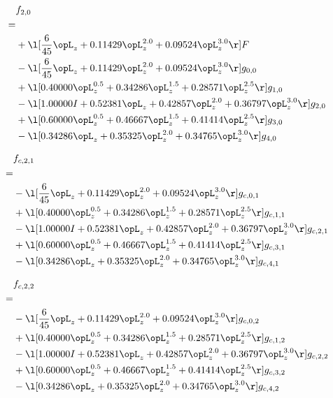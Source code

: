\begin{alignat}{2} 
\label{eq:f_20_0} 
& f_{2,0} \nonumber \\ 
 = \\ 
& + \l[ \frac{6}{45} \opL_z +  0.11429 \opL_z^{2.0} +  0.09524 \opL_z^{3.0}  \r] F \nonumber \\ 
& - \l[ \frac{6}{45} \opL_z +  0.11429 \opL_z^{2.0} +  0.09524 \opL_z^{3.0}  \r] g_{0,0} \nonumber \\ 
& + \l[  0.40000 \opL_z^{0.5} +  0.34286 \opL_z^{1.5} +  0.28571 \opL_z^{2.5}  \r] g_{1,0} \nonumber \\ 
& - \l[  1.00000 I +  0.52381 \opL_z +  0.42857 \opL_z^{2.0} +  0.36797 \opL_z^{3.0}  \r] g_{2,0} \nonumber \\ 
& + \l[  0.60000 \opL_z^{0.5} +  0.46667 \opL_z^{1.5} +  0.41414 \opL_z^{2.5}  \r] g_{3,0} \nonumber \\ 
& - \l[  0.34286 \opL_z +  0.35325 \opL_z^{2.0} +  0.34765 \opL_z^{3.0}  \r] g_{4,0} \nonumber \\ 
\end{alignat} 


\begin{alignat}{2} 
\label{eq:f_21_0} 
& f_{c,2,1} \nonumber \\ 
 = \\ 
& - \l[ \frac{6}{45} \opL_z +  0.11429 \opL_z^{2.0} +  0.09524 \opL_z^{3.0}  \r] g_{c,0,1} \nonumber \\ 
& + \l[  0.40000 \opL_z^{0.5} +  0.34286 \opL_z^{1.5} +  0.28571 \opL_z^{2.5}  \r] g_{c,1,1} \nonumber \\ 
& - \l[  1.00000 I +  0.52381 \opL_z +  0.42857 \opL_z^{2.0} +  0.36797 \opL_z^{3.0}  \r] g_{c,2,1} \nonumber \\ 
& + \l[  0.60000 \opL_z^{0.5} +  0.46667 \opL_z^{1.5} +  0.41414 \opL_z^{2.5}  \r] g_{c,3,1} \nonumber \\ 
& - \l[  0.34286 \opL_z +  0.35325 \opL_z^{2.0} +  0.34765 \opL_z^{3.0}  \r] g_{c,4,1} \nonumber \\ 
\end{alignat} 


\begin{alignat}{2} 
\label{eq:f_22_0} 
& f_{c,2,2} \nonumber \\ 
 = \\ 
& - \l[ \frac{6}{45} \opL_z +  0.11429 \opL_z^{2.0} +  0.09524 \opL_z^{3.0}  \r] g_{c,0,2} \nonumber \\ 
& + \l[  0.40000 \opL_z^{0.5} +  0.34286 \opL_z^{1.5} +  0.28571 \opL_z^{2.5}  \r] g_{c,1,2} \nonumber \\ 
& - \l[  1.00000 I +  0.52381 \opL_z +  0.42857 \opL_z^{2.0} +  0.36797 \opL_z^{3.0}  \r] g_{c,2,2} \nonumber \\ 
& + \l[  0.60000 \opL_z^{0.5} +  0.46667 \opL_z^{1.5} +  0.41414 \opL_z^{2.5}  \r] g_{c,3,2} \nonumber \\ 
& - \l[  0.34286 \opL_z +  0.35325 \opL_z^{2.0} +  0.34765 \opL_z^{3.0}  \r] g_{c,4,2} \nonumber \\ 
\end{alignat} 


